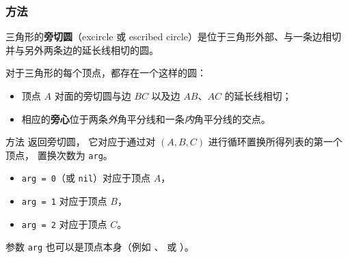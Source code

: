 \subsubsection{方法 } %
\label{ssub:method_triangle_ex__circle}

三角形的\textbf{旁切圆}（excircle 或 escribed circle）是位于三角形外部、与一条边相切并与另外两条边的延长线相切的圆。

\medskip

对于三角形的每个顶点，都存在一个这样的圆：
\begin{itemize}
  \item 顶点 $A$ 对面的旁切圆与边 $BC$ 以及边 $AB$、$AC$ 的延长线相切；
  \item 相应的\textbf{旁心}位于两条\emph{外}角平分线和一条\emph{内}角平分线的交点。
\end{itemize}


方法  返回旁切圆，
它对应于通过对 $(A,B,C)$ 进行循环置换所得列表的第一个顶点，
置换次数为 \verb|arg|。

\begin{itemize}
  \item \verb|arg = 0|（或 \verb|nil|）对应于顶点 $A$，
  \item \verb|arg = 1| 对应于顶点 $B$，
  \item \verb|arg = 2| 对应于顶点 $C$。
\end{itemize}

参数 \verb|arg| 也可以是顶点本身（例如 、 或 ）。

\vspace{1em}

